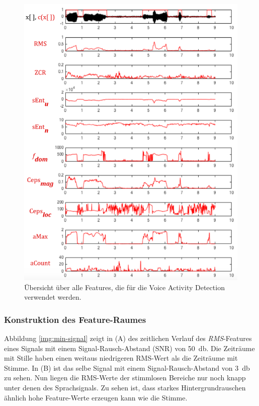 \begin{figure}[h!]
	\centering
	\includegraphics[width=1\textwidth]{bilder/allFeatures01.png}
	\caption{Übersicht über alle Features, die für die Voice Activity Detection verwendet werden.}
	\label{img:vadAllFeatures}
\end{figure}

\subsubsection{Konstruktion des Feature-Raumes}

Abbildung \ref{img:min-signal} zeigt in (A) des zeitlichen Verlauf des \emph{RMS}-Features eines Signals mit einem Signal-Rausch-Abstand (SNR) von \SI{50}{\decibel}. Die Zeiträume mit Stille haben einen weitaus niedrigeren RMS-Wert als die Zeiträume mit Stimme. In (B) ist das selbe Signal mit einem Signal-Rausch-Abstand von \SI{3}{\decibel} zu sehen. Nun liegen die RMS-Werte der stimmlosen Bereiche nur noch knapp unter denen des Sprachsignals. Zu sehen ist, dass starkes Hintergrundrauschen ähnlich hohe Feature-Werte erzeugen kann wie die Stimme.

